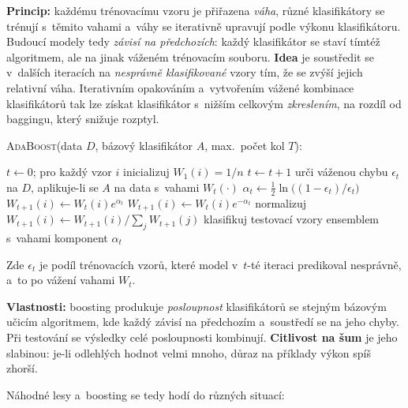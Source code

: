 \documentclass[11pt,a4paper]{article}
\theoremstyle{definition}
\begin{document}
\begin{defbox}
\textbf{Princip:} každému trénovacímu vzoru je přiřazena \emph{váha}, různé klasifikátory se
trénují s~těmito vahami a~váhy se iterativně upravují podle výkonu klasifikátoru. Budoucí
modely tedy \emph{závisí na předchozích}: každý klasifikátor se staví tímtéž algoritmem, ale
na jinak váženém trénovacím souboru. \textbf{Idea} je soustředit se v~dalších iteracích na
\emph{nesprávně klasifikované} vzory tím, že se zvýší jejich relativní váha. Iterativním
opakováním a~vytvořením vážené kombinace klasifikátorů tak lze získat klasifikátor s~nižším
celkovým \emph{zkreslením}, na rozdíl od baggingu, který snižuje rozptyl.

\textsc{AdaBoost}(data $D$, bázový klasifikátor $A$, max.\ počet kol $T$):
\begin{algorithmic}[1]
\State $t\gets 0$; pro každý vzor $i$ inicializuj $W_1(i)=1/n$
\Repeat
  \State $t\gets t+1$
  \State urči váženou chybu $\epsilon_t$ na $D$, aplikuje-li se $A$ na data s~vahami
         $W_t(\cdot)$
  \State $\alpha_t\gets \tfrac12\ln\big((1-\epsilon_t)/\epsilon_t\big)$
     \State $W_{t+1}(i)\gets W_t(i)e^{\alpha_t}$
  \EndFor
     \State $W_{t+1}(i)\gets W_t(i)e^{-\alpha_t}$
  \EndFor
  \State normalizuj $W_{t+1}(i)\gets W_{t+1}(i)/\sum_j W_{t+1}(j)$
\State klasifikuj testovací vzory ensemblem s~vahami komponent $\alpha_t$
\end{algorithmic}
Zde $\epsilon_t$ je podíl trénovacích vzorů, které model v~$t$-té iteraci predikoval
nesprávně, a~to po vážení vahami $W_t$.

\textbf{Vlastnosti:} boosting produkuje \emph{posloupnost} klasifikátorů se stejným bázovým
učicím algoritmem, kde každý závisí na předchozím a~soustředí se na jeho chyby. Při testování
se výsledky celé posloupnosti kombinují. \textbf{Citlivost na šum} je jeho slabinou: je-li
odlehlých hodnot velmi mnoho, důraz na  příklady výkon spíš zhorší.
\end{defbox}

Náhodné lesy a~boosting se tedy hodí do různých situací:
\end{document}
